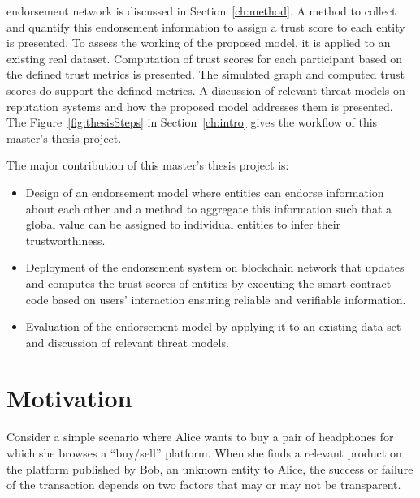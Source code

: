 endorsement network is discussed in Section~\ref{ch:method}. A method to
collect and quantify this endorsement information to assign a trust score to
each entity is presented. To assess the working of the proposed model, it is
applied to an existing real dataset. Computation of trust scores for each
participant based on the defined trust metrics is presented. The simulated
graph and computed trust scores do support the defined metrics. A discussion of
relevant threat models on reputation systems and how the proposed model
addresses them is presented. The Figure~\ref{fig:thesisSteps} in
Section~\ref{ch:intro} gives the workflow of this master’s thesis project. \par
The major contribution of this master's thesis project is:
\begin{itemize}
	\item Design of an endorsement model where entities can endorse information
		about each other and a method to aggregate this information such that a
		global value can be assigned to individual entities to infer their
		trustworthiness.
	\item Deployment of the endorsement system on blockchain network that
		updates and computes the trust scores of entities by executing the
		smart contract code based on users' interaction ensuring reliable and
		verifiable information. 
	\item Evaluation of the endorsement model by applying it to an existing
		data set and discussion of relevant threat models.
\end{itemize}


 
\section{Motivation}
Consider a simple scenario where Alice wants to buy a pair of headphones for
which she browses a ``buy/sell'' platform. When she finds a relevant product on
the platform published by Bob, an unknown entity to Alice, the success or
failure of the transaction depends on two factors that may or may not be
transparent.
